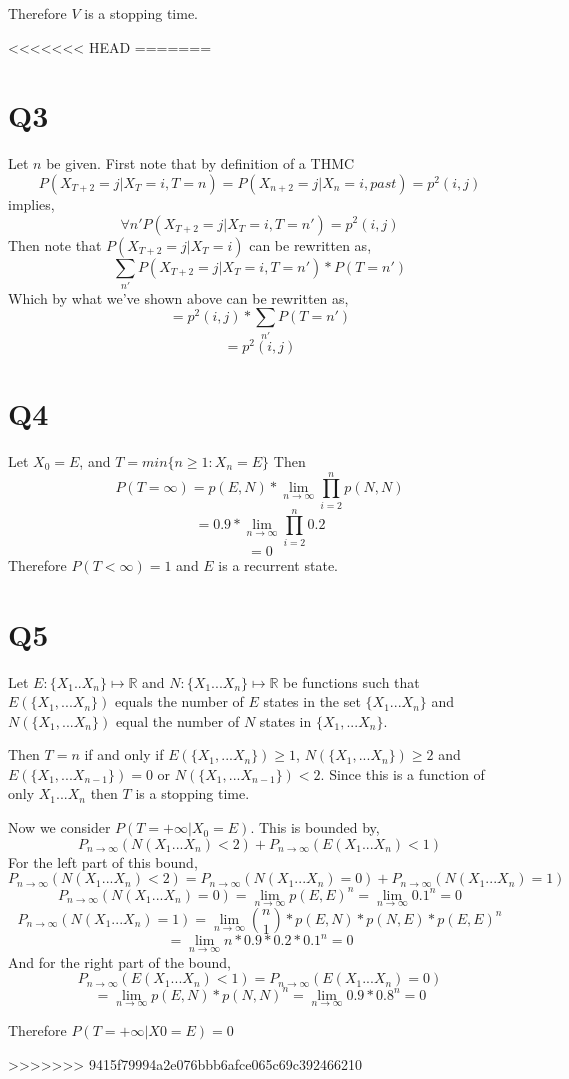\documentclass{article}
\begin{document}
Therefore $V$ is a stopping time.

<<<<<<< HEAD
=======
\section*{Q3}
Let $n$ be given. First note that by definition of a THMC
\[
P(X_{T+2} = j | X_T = i , T = n) = P(X_{n+2} = j | X_n = i, past) = p^2(i,j)
\]
implies,
\[
\forall n'
P(X_{T+2} = j | X_T = i , T = n') = p^2(i,j)
\]
Then note that $P(X_{T+2} = j | X_T = i)$ can be rewritten as,
\[
\sum_{n'} P(X_{T+2} = j | X_T = i, T=n')*P(T=n')
\]
Which by what we've shown above can be rewritten as,
\[
= p^2(i,j) * \sum_{n'} P(T=n')
\] 
\[
=p^2(i,j)
\]

\section*{Q4}
Let $X_0 = E$, and $T = min\{n \geq 1 : X_n = E\}$
Then 
\[
P(T = \infty) = p(E,N) * \lim_{n \to \infty} \prod_{i = 2}^{n} p(N,N)
\]
\[
= 0.9 * \lim_{n \to \infty} \prod_{i = 2}^{n} 0.2
\]
\[
= 0
\]
Therefore $P(T < \infty) = 1$ and $E$ is a recurrent state.

\section*{Q5}
Let $E : \{X_1 .. X_n\} \mapsto \mathbb{R}$ and $N : \{X_1 ... X_n\} \mapsto \mathbb{R}$ be functions such that $E(\{X_1, ... X_n\})$ equals the number of $E$ states in the set $\{X_1 ... X_n\}$ and $N(\{X_1, ... X_n\})$ equal the number of $N$ states in $\{X_1, ... X_n\}$. 

Then $T = n$ if and only if $E(\{X_1,... X_n\}) \geq 1$, $N(\{X_1,... X_n\}) \geq 2$ and $E(\{X_1,... X_{n-1}\}) = 0$ or $N(\{X_1,... X_{n-1}\}) < 2$. Since this is a function of only $X_1 ... X_n$ then $T$ is a stopping time. 

Now we consider $P(T = +\infty | X_0 = E)$.
This is bounded by,
\[
P_{n \to \infty}(N(X_1 ... X_n) < 2) + P_{n \to \infty}(E(X_1 ... X_n) < 1)
\]
For the left part of this bound,
\[
P_{n \to \infty}(N(X_1 ... X_n) < 2) = P_{n \to \infty}(N(X_1 ... X_n) = 0) + 
P_{n \to \infty}(N(X_1 ... X_n) = 1)
\]
\[
P_{n \to \infty}(N(X_1 ... X_n) = 0) = \lim_{n \to \infty} p(E,E)^n =\lim_{n \to \infty} 0.1^n = 0
\]
\[
P_{n \to \infty}(N(X_1 ... X_n) = 1) = \lim_{n \to \infty} {{n}\choose{1}} * p(E,N) * p(N,E) * p(E,E)^n
\]
\[
= \lim_{n \to \infty} n * 0.9 * 0.2 * 0.1 ^n = 0
\]
And for the right part of the bound,
\[ 
P_{n \to \infty}(E(X_1 ... X_n) < 1) = P_{n \to \infty}(E(X_1 ... X_n) = 0)
\]
\[
= \lim_{n \to \infty} p(E,N) * p(N,N)^n = \lim_{n \to \infty} 0.9 * 0.8 ^ n = 0
\]

Therefore $P( T = +\infty | X0 = E) = 0$




>>>>>>> 9415f79994a2e076bbb6afce065c69c392466210
\end{document}
